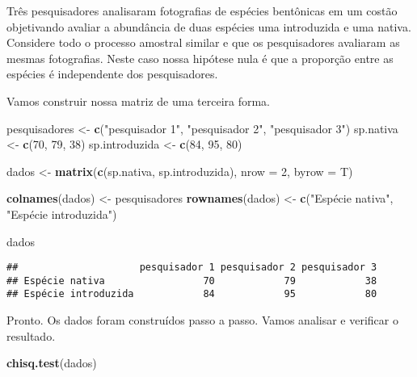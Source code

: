 \documentclass[]{book}
\newenvironment{Shaded}{\begin{snugshade}}{\end{snugshade}}
\newcommand{\DataTypeTok}[1]{\textcolor[rgb]{0.13,0.29,0.53}{#1}}
\newcommand{\DecValTok}[1]{\textcolor[rgb]{0.00,0.00,0.81}{#1}}
\newcommand{\KeywordTok}[1]{\textcolor[rgb]{0.13,0.29,0.53}{\textbf{#1}}}
\newcommand{\NormalTok}[1]{#1}
\newcommand{\StringTok}[1]{\textcolor[rgb]{0.31,0.60,0.02}{#1}}
\begin{document}
Três pesquisadores analisaram fotografias de espécies bentônicas em um costão objetivando avaliar a abundância de duas espécies uma introduzida e uma nativa. Considere todo o processo amostral similar e que os pesquisadores avaliaram as mesmas fotografias. Neste caso nossa hipótese nula é que a proporção entre as espécies é independente dos pesquisadores.

Vamos construir nossa matriz de uma terceira forma.

\begin{Shaded}
\begin{Highlighting}[]
\NormalTok{pesquisadores <-}\StringTok{ }\KeywordTok{c}\NormalTok{(}\StringTok{"pesquisador 1"}\NormalTok{, }\StringTok{"pesquisador 2"}\NormalTok{, }\StringTok{"pesquisador 3"}\NormalTok{)}
\NormalTok{sp.nativa <-}\StringTok{ }\KeywordTok{c}\NormalTok{(}\DecValTok{70}\NormalTok{, }\DecValTok{79}\NormalTok{, }\DecValTok{38}\NormalTok{)}
\NormalTok{sp.introduzida <-}\StringTok{ }\KeywordTok{c}\NormalTok{(}\DecValTok{84}\NormalTok{, }\DecValTok{95}\NormalTok{, }\DecValTok{80}\NormalTok{)}

\NormalTok{dados <-}\StringTok{ }\KeywordTok{matrix}\NormalTok{(}\KeywordTok{c}\NormalTok{(sp.nativa, sp.introduzida), }\DataTypeTok{nrow =} \DecValTok{2}\NormalTok{, }\DataTypeTok{byrow =}\NormalTok{ T)}

\KeywordTok{colnames}\NormalTok{(dados) <-}\StringTok{ }\NormalTok{pesquisadores}
\KeywordTok{rownames}\NormalTok{(dados) <-}\StringTok{ }\KeywordTok{c}\NormalTok{(}\StringTok{"Espécie nativa"}\NormalTok{, }\StringTok{"Espécie introduzida"}\NormalTok{)}

\NormalTok{dados}
\end{Highlighting}
\end{Shaded}

\begin{verbatim}
##                     pesquisador 1 pesquisador 2 pesquisador 3
## Espécie nativa                 70            79            38
## Espécie introduzida            84            95            80
\end{verbatim}

Pronto. Os dados foram construídos passo a passo. Vamos analisar e verificar o resultado.

\begin{Shaded}
\begin{Highlighting}[]
\KeywordTok{chisq.test}\NormalTok{(dados)}
\end{Highlighting}
\end{Shaded}
\end{document}
